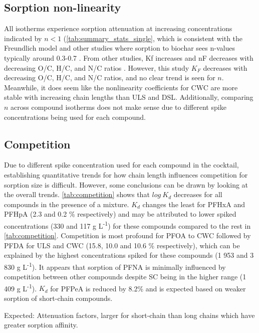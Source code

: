 \subsection{Sorption non-linearity}
All isotherms experience sorption attenuation at increasing concentrations indicated by $n<1 $ (\cref{tab:summary_stats_single}, which is consistent with the Freundlich model and other studies where sorption to biochar sees n-values typically around 0.3-0.7 \citep{Cornelissen2005}. From other studies, Kf increases and nF decreases with decreasing O/C, H/C, and N/C ratios \citep{Cornelissen2005}. However, this study $K_F$ decreases with decreasing O/C, H/C, and N/C ratios, and no clear trend is seen for $n$. Meanwhile, it does seem like the nonlinearity coefficients for CWC are more stable with increasing chain lengths than ULS and DSL. Additionally, comparing $n$ across compound isotherms does not make sense due to different spike concentrations being used for each compound. 

\subsection{Competition}
Due to different spike concentration used for each compound in the cocktail, establishing quantitative trends for how chain length influences competition for sorption size is difficult. However, some conclusions can be drawn by looking at the overall trends. \cref{tab:competition} shows that $log~K_d$ decreases for all compounds in the presence of a mixture. $K_d$ changes the least for PFHxA and PFHpA (2.3 and 0.2 \% respectively) and may be attributed to lower spiked concentrations (330 and 117 \textmu g L\textsuperscript{-1}) for these compounds compared to the rest in \cref{tab:competition}. Competition is most profound for PFOA to CWC followed by PFDA for ULS and CWC (15.8, 10.0 and 10.6 \% respectively), which can be explained by the highest concentrations spiked for these compounds (1 953 and 3 830 \textmu g L\textsuperscript{-1}). It appears that sorption of PFNA is minimally influenced by competition between other compounds despite SC being in the higher range (1 409 \textmu g L\textsuperscript{-1}). $K_d$ for PFPeA is reduced by 8.2\% and is expected based on weaker sorption of short-chain compounds.

Expected: Attenuation factors, larger for short-chain than long chains which have greater sorption affinity.

